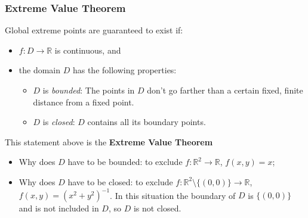 \begin{frame}
  \frametitle{Extreme Value Theorem}

Global extreme points are guaranteed to exist if:

\begin{itemize}
  \item $f \colon D \to \mathbb{R}$ is continuous, and
  \item the domain $D$ has the following properties:
  \begin{itemize}
    \item $D$ is \emph{bounded}: The points in $D$ don't go farther than a certain fixed, finite distance from a fixed point.
    \item $D$ is \emph{closed}: $D$ contains all its boundary points.
  \end{itemize}
\end{itemize}
%

This statement above is the \textbf{Extreme Value Theorem}

\begin{itemize}
  \item \pause Why does $D$ have to be bounded: \pause to exclude $f\colon \mathbb{R}^2 \to \mathbb{R}$, $f(x,y) = x$;
  \item \pause Why does $D$ have to be closed: \pause to exclude $f\colon \mathbb{R}^2\setminus\{(0,0)\} \to \mathbb{R}$, $f(x,y) = (x^2+y^2)^{-1}$. In this situation the boundary of $D$ is $\{(0,0)\}$ and is not included in $D$, so $D$ is not closed.
\end{itemize}
\end{frame}